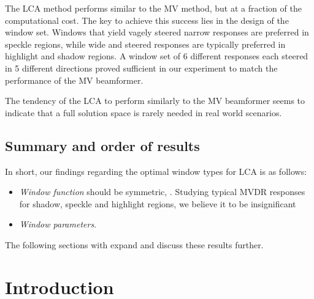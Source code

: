 \documentclass[10pt,journal,draftclsnofoot,onecolumn]{IEEEtran}
\newcommand\1{\vec 1}
\begin{document}
The LCA method performs similar to the MV method, but at a fraction of the computational cost. The key to achieve this success lies in the design of the window set. Windows that yield vagely steered narrow responses are preferred in speckle regions, while wide and steered responses are typically preferred in highlight and shadow regions. A window set of 6 different responses each steered in 5 different directions proved sufficient in our experiment to match the performance of the MV beamformer.

The tendency of the LCA to perform similarly to the MV beamformer seems to indicate that a full solution space is rarely needed in real world scenarios. 


\subsection{Summary and order of results}

In short, our findings regarding the optimal window types for LCA is as follows:

\begin{itemize}
\item \emph{Window function} should be symmetric, . Studying typical MVDR responses for shadow, speckle and highlight regions, we believe it to be insignificant
\item \emph{Window parameters}. 
\end{itemize}

The following sections with expand and discuss these results further.

\section{Introduction}
\end{document}
